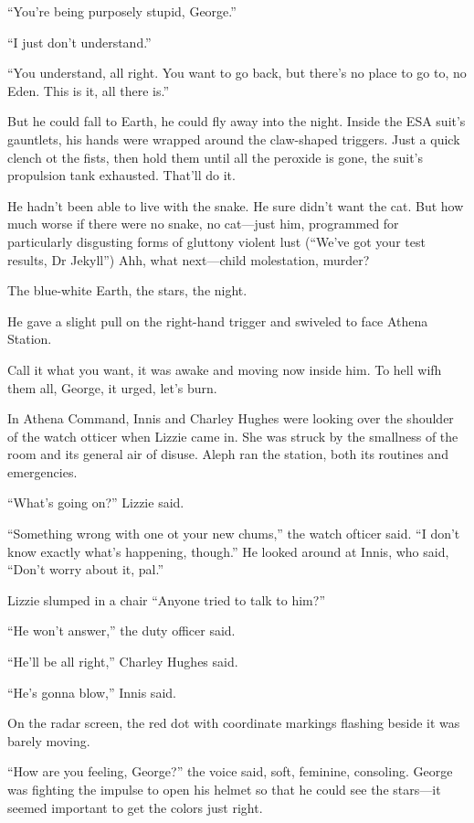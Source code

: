 “You’re being purposely stupid, George.”

“I just don’t understand.”

“You understand, all right. You want to go back, but there’s no place to go to, no Eden. This is it, all there is.”

But he could fall to Earth, he could fly away into the night. Inside the ESA suit’s gauntlets, his hands were wrapped around the claw-shaped triggers. Just a quick clench ot the fists, then hold them until all the peroxide is gone, the suit’s propulsion tank exhausted. That’ll do it.

He hadn’t been able to live with the snake. He sure didn’t want the cat. But how much worse if there were no snake, no cat—just him, programmed for particularly disgusting forms of gluttony violent lust (“We’ve got your test results, Dr Jekyll”) Ahh, what next—child molestation, murder?

The blue-white Earth, the stars, the night.

He gave a slight pull on the right-hand trigger and swiveled to face Athena Station.

Call it what you want, it was awake and moving now inside him. To hell wifh them all, George, it urged, let’s burn.

In Athena Command, Innis and Charley Hughes were looking over the shoulder of the watch otticer when Lizzie came in. She was struck by the smallness of the room and its general air of disuse. Aleph ran the station, both its routines and emergencies.

“What’s going on?” Lizzie said.

“Something wrong with one ot your new chums,” the watch ofticer said. “I don’t know exactly what’s happening, though.” He looked around at Innis, who said, “Don’t worry about it, pal.”

Lizzie slumped in a chair “Anyone tried to talk to him?”

“He won’t answer,” the duty officer said.

“He’ll be all right,” Charley Hughes said.

“He’s gonna blow,” Innis said.

On the radar screen, the red dot with coordinate markings flashing beside it was barely moving.

“How are you feeling, George?” the voice said, soft, feminine, consoling. George was fighting the impulse to open his helmet so that he could see the stars—it seemed important to get the colors just right.


